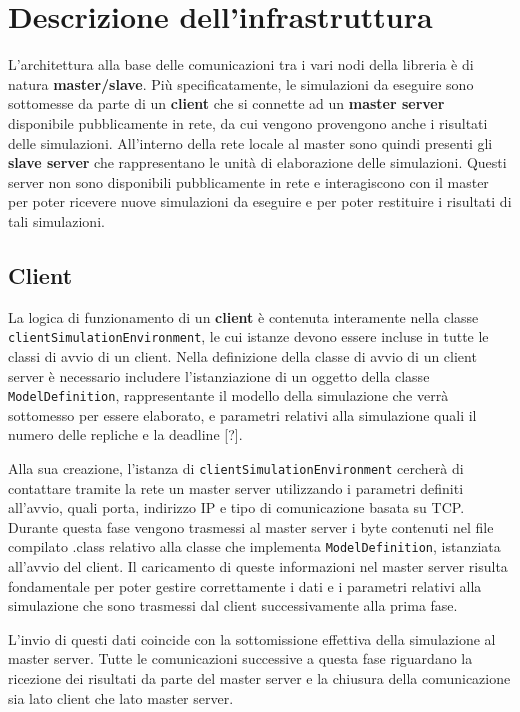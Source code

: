 
\section{Descrizione dell'infrastruttura}
L'architettura alla base delle comunicazioni tra i vari nodi della libreria è di natura \textbf{master/slave}.
Più specificatamente, le simulazioni da eseguire sono sottomesse da parte di un \textbf{client} che si connette ad un \textbf{master server} disponibile pubblicamente in rete, da cui vengono provengono anche i risultati delle simulazioni. 
All'interno della rete locale al master sono quindi presenti gli \textbf{slave server} che rappresentano le unità di elaborazione delle simulazioni. Questi server non sono disponibili pubblicamente in rete e interagiscono con il master per poter ricevere nuove simulazioni da eseguire e per poter restituire i risultati di tali simulazioni.

\subsection{Client}
La logica di funzionamento di un \textbf{client} è contenuta interamente nella classe \texttt{clientSimulationEnvironment}, le cui istanze devono essere incluse in tutte le classi di avvio di un client.
Nella definizione della classe di avvio di un client server è necessario includere l'istanziazione di un oggetto della classe \texttt{ModelDefinition}, rappresentante il modello della simulazione che verrà sottomesso per essere elaborato, e parametri relativi alla simulazione quali il numero delle repliche e la deadline [?].

Alla sua creazione, l'istanza di \texttt{clientSimulationEnvironment} cercherà di contattare tramite la rete un master server utilizzando i parametri definiti all'avvio, quali porta, indirizzo IP e tipo di comunicazione basata su TCP. 
Durante questa fase vengono trasmessi al master server i byte contenuti nel file compilato .class relativo alla classe che implementa \texttt{ModelDefinition}, istanziata all'avvio del client.
Il caricamento di queste informazioni nel master server risulta fondamentale per poter gestire correttamente i dati e i parametri relativi alla simulazione che sono trasmessi dal client successivamente alla prima fase.

L'invio di questi dati coincide con la sottomissione effettiva della simulazione al master server. 
Tutte le comunicazioni successive a questa fase riguardano la ricezione dei risultati da parte del master server e la chiusura della comunicazione sia lato client che lato master server.


